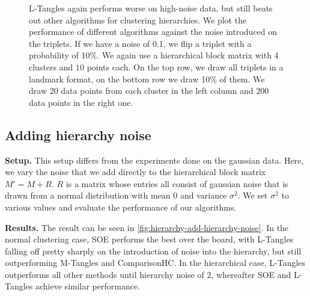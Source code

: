 \begin{figure}[ht]
    \centering
    \hfill
    \caption{
        L-Tangles again performs worse on high-noise data, but still beats out other algorithms for clustering hierarchies.
        We plot the performance of different algorithms against the noise introduced on the triplets. 
        If we have a noise of 0.1, we flip a triplet with a probability of 10\%.  
        We again use a hierarchical block matrix with $4$ clusters and $10$ points each. 
        On the top row, we draw all triplets in a landmark format, on the bottom row we draw 10\% of them.    
        We draw $20$ data points from each cluster in the left column and $200$ data points in the right one.
    }
    \label{fig:hierarchy-add-triplet-noise}
\end{figure}

\subsection{Adding hierarchy noise}\label{sec:adding-hierarchy-noise}
\textbf{Setup.}
This setup differs from the experiments done on the gaussian data. Here, we vary the noise that we add directly to the hierarchical block matrix $M' = M + R$. 
$R$ is a matrix whose entries all consist of gaussian noise that is drawn from a normal distribution with mean $0$ and variance $\sigma^2$. We set $\sigma^2$ to various 
values and evaluate the performance of our algorithms. 

\noindent
\textbf{Results.}
The result can be seen in \autoref{fig:hierarchy-add-hierarchy-noise}. In the normal clustering case, 
SOE performs the best over the board, with L-Tangles
falling off pretty sharply on the introduction of noise into the hierarchy, but still outperforming M-Tangles and ComparisonHC. In the hierarchical case, L-Tangles outperforms all other methods until hierarchy noise of $2$, whereafter SOE and L-Tangles achieve similar performance. 


